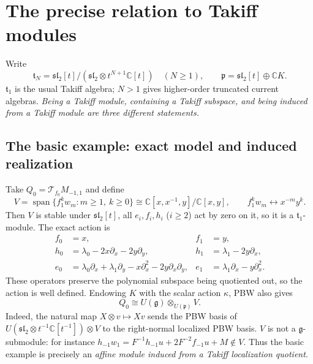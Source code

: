 \documentclass[11pt,a4paper]{article}
\theoremstyle{upright}
\newcommand{\C}{\mathbb C}
\newcommand{\g}{\mathfrak g}
\newcommand{\p}{\mathfrak p}
\newcommand{\slc}{\mathfrak{sl}_2}
\newcommand{\T}{\mathcal T}
\DeclareMathOperator{\Span}{span}
\begin{document}
\section{The precise relation to Takiff modules}

Write
\[
\mathfrak t_N=\slc[t]/(\slc\otimes t^{N+1}\C[t])\quad(N\ge1),
\qquad \p=\slc[t]\oplus\C K.
\]
$\mathfrak t_1$ is the usual Takiff algebra; $N>1$ gives higher-order
truncated current algebras. \emph{Being a Takiff module, containing a Takiff
subspace, and being induced from a Takiff module are three different
statements.}

\subsection{The basic example: exact model and induced realization}
Take $Q_0=\T_{f_0}M_{-1,1}$ and define
\[
V=\Span\{f_1^kw_m:m\ge1,\ k\ge0\}
\cong\C[x,x^{-1},y]/\C[x,y],\qquad f_1^kw_m\longleftrightarrow x^{-m}y^k.
\]
Then $V$ is stable under $\slc[t]$, all $e_i,f_i,h_i$ ($i\ge2$) act by zero on
it, so it is a $\mathfrak t_1$-module. The exact action is
\cite[Section 6]{Unified}
\begin{equation}\label{eq:takiff}
\begin{aligned}
f_0&=x,& f_1&=y,\\
h_0&=\lambda_0-2x\partial_x-2y\partial_y,
&h_1&=\lambda_1-2y\partial_x,\\
e_0&=\lambda_0\partial_x+\lambda_1\partial_y
-x\partial_x^2-2y\partial_x\partial_y,
&e_1&=\lambda_1\partial_x-y\partial_x^2.
\end{aligned}
\end{equation}
These operators preserve the polynomial subspace being quotiented out, so
the action is well defined. Endowing $K$ with the scalar action $\kappa$, PBW
also gives
\begin{equation}\label{eq:ind-basic}
\boxed{\quad Q_0\cong U(\g)\otimes_{U(\p)}V.\quad}
\end{equation}
Indeed, the natural map $X\otimes v\mapsto Xv$ sends the PBW basis of
$U(\slc\otimes t^{-1}\C[t^{-1}])\otimes V$ to the right-normal localized PBW
basis. $V$ is not a $\g$-submodule: for instance
$h_{-1}w_1=F^{-1}h_{-1}u+2F^{-2}f_{-1}u+M\notin V$. Thus the basic example is
precisely an \emph{affine module induced from a Takiff localization
quotient}.
\end{document}
